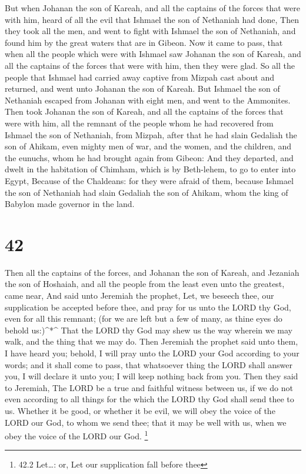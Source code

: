  But when Johanan the son of Kareah, and all the captains
of the forces that were with him, heard of all the evil that Ishmael the
son of Nethaniah had done,  Then they took all the men, and
went to fight with Ishmael the son of Nethaniah, and found him by the
great waters that are in Gibeon.  Now it came to pass, that
when all the people which were with Ishmael saw Johanan the son of
Kareah, and all the captains of the forces that were with him, then they
were glad.  So all the people that Ishmael had carried away
captive from Mizpah cast about and returned, and went unto Johanan the
son of Kareah.  But Ishmael the son of Nethaniah escaped
from Johanan with eight men, and went to the Ammonites. 
Then took Johanan the son of Kareah, and all the captains of the forces
that were with him, all the remnant of the people whom he had recovered
from Ishmael the son of Nethaniah, from Mizpah, after that he had slain
Gedaliah the son of Ahikam, even mighty men of war, and the women, and
the children, and the eunuchs, whom he had brought again from Gibeon:
 And they departed, and dwelt in the habitation of Chimham,
which is by Beth-lehem, to go to enter into Egypt,  Because
of the Chaldeans: for they were afraid of them, because Ishmael the son
of Nethaniah had slain Gedaliah the son of Ahikam, whom the king of
Babylon made governor in the land.

\hypertarget{section-41}{%
\section{42}\label{section-41}}

 Then all the captains of the forces, and Johanan the son of
Kareah, and Jezaniah the son of Hoshaiah, and all the people from the
least even unto the greatest, came near,  And said unto
Jeremiah the prophet, Let, we beseech thee, our supplication be accepted
before thee, and pray for us unto the LORD thy God, even for all this
remnant; (for we are left but a few of many, as thine eyes do behold
us:)\^{}*\^{}  That the LORD thy God may shew us the way
wherein we may walk, and the thing that we may do.  Then
Jeremiah the prophet said unto them, I have heard you; behold, I will
pray unto the LORD your God according to your words; and it shall come
to pass, that whatsoever thing the LORD shall answer you, I will declare
it unto you; I will keep nothing back from you.  Then they
said to Jeremiah, The LORD be a true and faithful witness between us, if
we do not even according to all things for the which the LORD thy God
shall send thee to us.  Whether it be good, or whether it be
evil, we will obey the voice of the LORD our God, to whom we send thee;
that it may be well with us, when we obey the voice of the LORD our God.
\footnote{42.2 Let\ldots: or, Let our supplication fall before thee}

